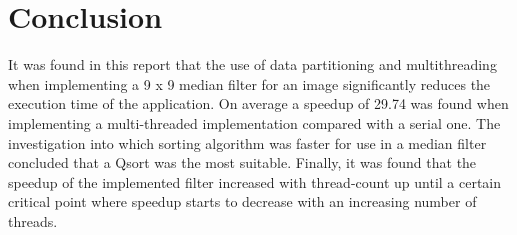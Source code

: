 \section{Conclusion}
It was found in this report that the use of data partitioning and multithreading when implementing a 9 x 9 median filter for an image significantly reduces the execution time of the application. On average a speedup of 29.74 was found when implementing a multi-threaded implementation compared with a serial one. The investigation into which sorting algorithm was faster for use in a median filter concluded that a Qsort was the most suitable. Finally, it was found that the speedup of the implemented filter increased with thread-count up until a certain critical point where speedup starts to decrease with an increasing number of threads.

